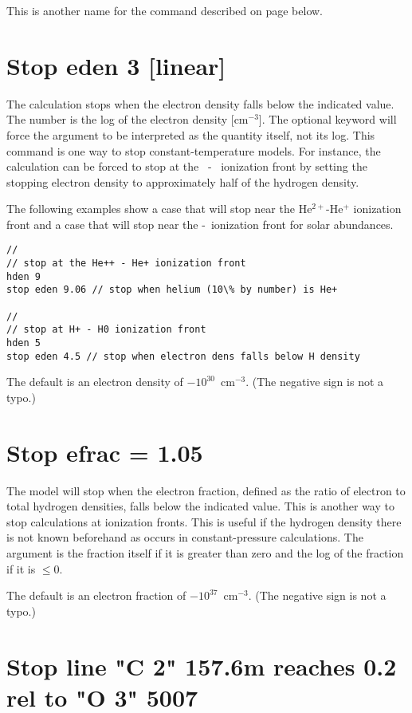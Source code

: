 This is another name for the  command
described on page \pageref{sec:CommandStopThckness} below.

\section{Stop eden 3 [linear]}

The calculation stops when the electron density falls below the
indicated value.
The number is the log of the electron density [cm$^{-3}$].
The optional
keyword  will force the argument to be interpreted as the quantity
itself, not its log.
This command is one way to stop constant-temperature
models.
For instance, the calculation can be forced to stop at the
\hplus\ - \hO\
ionization front by setting the stopping electron density to approximately
half of the hydrogen density.

The following examples show a case that will stop
near the
He$^{2+}$-He$^+$
ionization front and a case that will stop near
the \hplus-\hO\ ionization front
for solar abundances.
\begin{verbatim}
//
// stop at the He++ - He+ ionization front
hden 9
stop eden 9.06 // stop when helium (10\% by number) is He+

//
// stop at H+ - H0 ionization front
hden 5
stop eden 4.5 // stop when electron dens falls below H density
\end{verbatim}
The default is an electron density of $-10^{30}$~cm$^{-3}$.
(The negative sign
is not a typo.)

\section{Stop efrac = 1.05}

The model will stop when the electron fraction, defined as the ratio
of electron to total hydrogen densities, falls below the indicated value.
This is another way to stop calculations at ionization fronts.  This is
useful if the hydrogen density there is not known beforehand as occurs in
constant-pressure calculations.  The argument is the fraction itself if
it is greater than zero and the log of the fraction if it is $\le 0$.

The default is an electron fraction of $-10^{37}$~cm$^{-3}$.
(The negative sign is not a typo.)

\section{Stop line "C  2" 157.6m reaches 0.2 rel to  "O  3" 5007}

